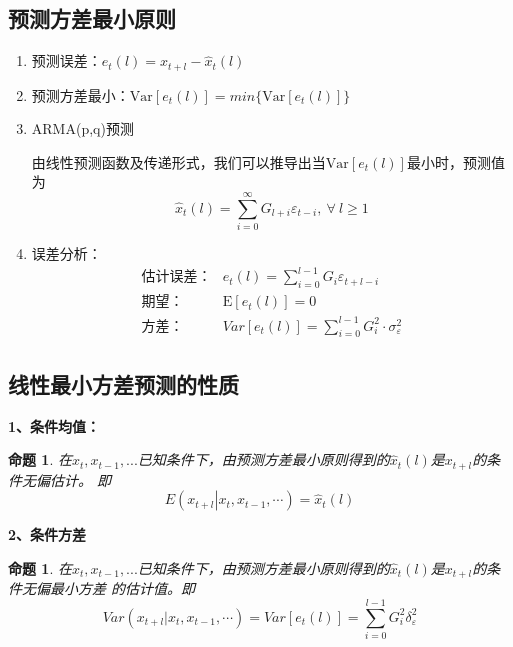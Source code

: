 \documentclass[12pt, a4paper, oneside]{ctexbook}
\newtheorem{proposition}[theorem]{命题}
\begin{document}
\subsection{预测方差最小原则}
\begin{enumerate}[1、]
    \item 预测误差：$e_t(l) = x_{t+l} - \hat{x}_t(l)$
    \item 预测方差最小：$\mathrm{Var}[e_t(l)] = min\{\mathrm{Var}[e_t(l)]\}$
    \item ARMA(p,q)预测

          由线性预测函数及传递形式，我们可以推导出当$\mathrm{Var}[e_t(l)]$最小时，预测值为
          \begin{equation}
              \hat{x}_t(l) = \sum_{i = 0}^{\infty}G_{l+i}\varepsilon_{t-i},~\forall ~l\geq 1
          \end{equation}
    \item 误差分析：
          \begin{equation}
              \begin{aligned}
                  \text{估计误差：} & e_t(l) = \sum_{i = 0}^{l-1}G_{i}\varepsilon_{t+l-i}        \\
                  \text{期望：}     & \mathrm{E}[e_t(l)] = 0                                     \\
                  \text{方差：}     & Var[e_t(l)]=\sum_{i=0}^{l-1}G_i^2\cdot\sigma_\varepsilon^2
              \end{aligned}
          \end{equation}
\end{enumerate}

\subsection{线性最小方差预测的性质}
\textbf{1、条件均值：}
\begin{proposition}
    在$x_t,x_{t-1},...$已知条件下，由预测方差最小原则得到的$\hat{x}_t(l)$是$x_{t+l}$的条件无偏估计。
    即
    \begin{equation}
        \left.E\left(x_{t+l}\right|x_{t},x_{t-1},\cdots\right)=\hat{x}_t(l)
    \end{equation}
\end{proposition}

\textbf{2、条件方差}

\begin{proposition}
    在$x_t,x_{t-1},...$已知条件下，由预测方差最小原则得到的$\hat{x}_t(l)$是$x_{t+l}$的条件无偏最小方差
    的估计值。即
    \begin{equation}
        Var(x_{t+l}|x_t,x_{t-1},\cdots)=Var[e_t(l)] = \sum_{i=0}^{l-1} G_{i}^{2}\delta_{\varepsilon}^2
    \end{equation}
\end{proposition}
\end{document}
